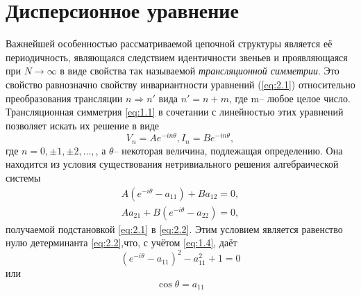 \section{Дисперсионное уравнение}
Важнейшей особенностью рассматриваемой цепочной структуры является её периодичность, являющаяся следствием идентичности звеньев и проявляющаяся при $N\rightarrow\infty$ в виде свойства так называемой \textit{трансляционной симметрии}. Это свойство равнозначно свойству инвариантности уравнений (\ref{eq:2.1}) относительно преобразования трансляции $n\Rightarrow n'$ вида $n'=n+m$, где m-- любое целое число. Трансляционная симметрия \eqref{eq:1.1} в сочетании с линейностью этих уравнений позволяет искать их решение в виде
\begin{equation}
\label{eq:2.1}
V_n=Ae^{-in\theta}, I_n=Be^{-in\theta},
\end{equation}
где $n=0,\pm1,\pm2,\dots,$, а $\theta$-- некоторая величина, подлежащая определению. Она находится из условия существования нетривиального решения алгебраической системы
\begin{equation}
	\label{eq:2.2}
	\begin{gathered}
	A(e^{-i\theta}-a_{11})+Ba_{12}=0, \\
	Aa_{21}+B(e^{-i\theta}-a_{22})=0,
	\end{gathered}
\end{equation}
получаемой подстановкой \eqref{eq:2.1} в \eqref{eq:2.2}. Этим условием является равенство нулю детерминанта \eqref{eq:2.2},что, с учётом \eqref{eq:1.4}, даёт
\begin{equation}
\label{eq:2.3}
(e^{-i\theta}-a_{11})^2-a^2_{11}+1=0
\end{equation}
или
\begin{equation}
\label{eq:2.4}
\cos\theta=a_{11}
\end{equation}

